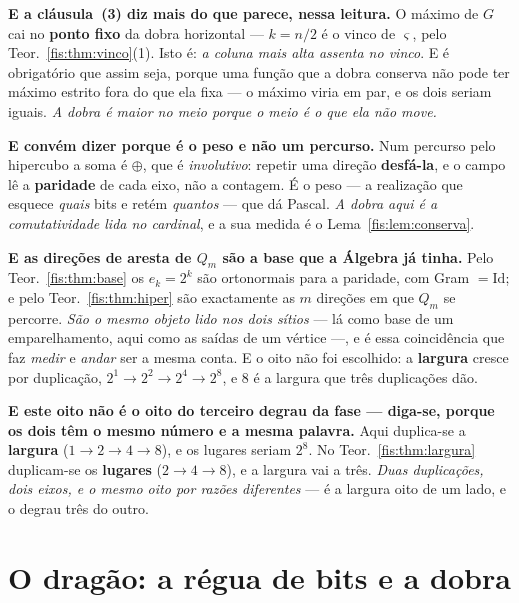 \documentclass[livro.tex]{subfiles}
\begin{document}
\medskip\noindent\textbf{E a cláusula~(3) diz mais do que parece, nessa
leitura.} O máximo de $G$ cai no \textbf{ponto fixo} da dobra horizontal ---
$k=n/2$ é o vinco de $\varsigma$, pelo Teor.~\ref{fis:thm:vinco}(1). Isto é: \emph{a
coluna mais alta assenta no vinco}. E é obrigatório que assim seja, porque uma
função que a dobra conserva não pode ter máximo estrito fora do que ela fixa ---
o máximo viria em par, e os dois seriam iguais. \emph{A dobra é maior no meio
porque o meio é o que ela não move.}

\medskip\noindent\textbf{E convém dizer porque é o peso e não um percurso.} Num
percurso pelo hipercubo a soma é $\oplus$, que é \emph{involutivo}: repetir uma
direção \textbf{desfá-la}, e o campo lê a \textbf{paridade} de cada eixo, não a
contagem. É o peso --- a realização que esquece \emph{quais} bits e retém
\emph{quantos} --- que dá Pascal. \emph{A dobra aqui é a comutatividade lida no
cardinal}, e a sua medida é o Lema~\ref{fis:lem:conserva}.

\medskip\noindent\textbf{E as direções de aresta de $Q_m$ são a base que a
Álgebra já tinha.} Pelo Teor.~\ref{fis:thm:base} os $e_k=2^{k}$ são ortonormais
para a paridade, com Gram $=\mathrm{Id}$; e pelo Teor.~\ref{fis:thm:hiper} são
exactamente as $m$ direções em que $Q_m$ se percorre. \emph{São o mesmo objeto
lido nos dois sítios} --- lá como base de um emparelhamento, aqui como as saídas
de um vértice ---, e é essa coincidência que faz \emph{medir} e \emph{andar} ser
a mesma conta. E o oito não foi escolhido: a \textbf{largura} cresce por
duplicação, $2^{1}\to2^{2}\to2^{4}\to2^{8}$, e $8$ é a largura que três
duplicações dão.

\medskip\noindent\textbf{E este oito não é o oito do terceiro degrau da fase ---
diga-se, porque os dois têm o mesmo número e a mesma palavra.} Aqui duplica-se a
\textbf{largura} ($1\to2\to4\to8$), e os lugares seriam $2^{8}$. No
Teor.~\ref{fis:thm:largura} duplicam-se os \textbf{lugares} ($2\to4\to8$), e a
largura vai a três. \emph{Duas duplicações, dois eixos, e o mesmo oito por razões
diferentes} --- é a largura oito de um lado, e o degrau três do outro.


\section{O dragão: a régua de bits e a dobra}\label{fis:dragao}
\end{document}
